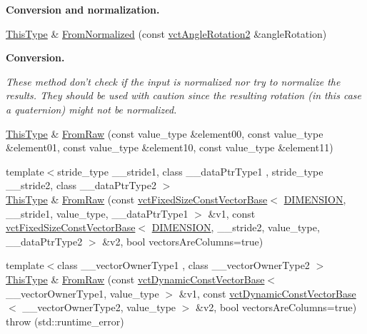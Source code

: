\begin{Indent}{\bf Conversion and normalization.}
\begin{DoxyCompactItemize}
\item 
\hyperlink{classvct_matrix_rotation2_base_a47ffeef2ddecede4b16bcc88fb432ff5}{This\-Type} \& \hyperlink{classvct_matrix_rotation2_base_a4d40e20f80b262c48616d04b536b45a3}{From\-Normalized} (const \hyperlink{classvct_angle_rotation2}{vct\-Angle\-Rotation2} \&angle\-Rotation)
\end{DoxyCompactItemize}
\end{Indent}
\begin{Indent}{\bf Conversion.}\par
{\em These method don't check if the input is normalized nor try to normalize the results. They should be used with caution since the resulting rotation (in this case a quaternion) might not be normalized. }\begin{DoxyCompactItemize}
\item 
\hyperlink{classvct_matrix_rotation2_base_a47ffeef2ddecede4b16bcc88fb432ff5}{This\-Type} \& \hyperlink{classvct_matrix_rotation2_base_ae633c71e95c1d085e567efcaece4cd0c}{From\-Raw} (const value\-\_\-type \&element00, const value\-\_\-type \&element01, const value\-\_\-type \&element10, const value\-\_\-type \&element11)
\item 
{\footnotesize template$<$stride\-\_\-type \-\_\-\-\_\-stride1, class \-\_\-\-\_\-data\-Ptr\-Type1 , stride\-\_\-type \-\_\-\-\_\-stride2, class \-\_\-\-\_\-data\-Ptr\-Type2 $>$ }\\\hyperlink{classvct_matrix_rotation2_base_a47ffeef2ddecede4b16bcc88fb432ff5}{This\-Type} \& \hyperlink{classvct_matrix_rotation2_base_a35d5e23c707144befb48f8ff25f9bcd9}{From\-Raw} (const \hyperlink{classvct_fixed_size_const_vector_base}{vct\-Fixed\-Size\-Const\-Vector\-Base}$<$ \hyperlink{classvct_matrix_rotation2_base_ac10279ed12ec787b1a4833ea02771348acefb9855f54f0cfd782e785c9083e592}{D\-I\-M\-E\-N\-S\-I\-O\-N}, \-\_\-\-\_\-stride1, value\-\_\-type, \-\_\-\-\_\-data\-Ptr\-Type1 $>$ \&v1, const \hyperlink{classvct_fixed_size_const_vector_base}{vct\-Fixed\-Size\-Const\-Vector\-Base}$<$ \hyperlink{classvct_matrix_rotation2_base_ac10279ed12ec787b1a4833ea02771348acefb9855f54f0cfd782e785c9083e592}{D\-I\-M\-E\-N\-S\-I\-O\-N}, \-\_\-\-\_\-stride2, value\-\_\-type, \-\_\-\-\_\-data\-Ptr\-Type2 $>$ \&v2, bool vectors\-Are\-Columns=true)
\item 
{\footnotesize template$<$class \-\_\-\-\_\-vector\-Owner\-Type1 , class \-\_\-\-\_\-vector\-Owner\-Type2 $>$ }\\\hyperlink{classvct_matrix_rotation2_base_a47ffeef2ddecede4b16bcc88fb432ff5}{This\-Type} \& \hyperlink{classvct_matrix_rotation2_base_ab20891b0ecb689d6824a7430e609cc08}{From\-Raw} (const \hyperlink{classvct_dynamic_const_vector_base}{vct\-Dynamic\-Const\-Vector\-Base}$<$ \-\_\-\-\_\-vector\-Owner\-Type1, value\-\_\-type $>$ \&v1, const \hyperlink{classvct_dynamic_const_vector_base}{vct\-Dynamic\-Const\-Vector\-Base}$<$ \-\_\-\-\_\-vector\-Owner\-Type2, value\-\_\-type $>$ \&v2, bool vectors\-Are\-Columns=true)  throw (std\-::runtime\-\_\-error)

\end{DoxyCompactItemize}
\end{Indent}
